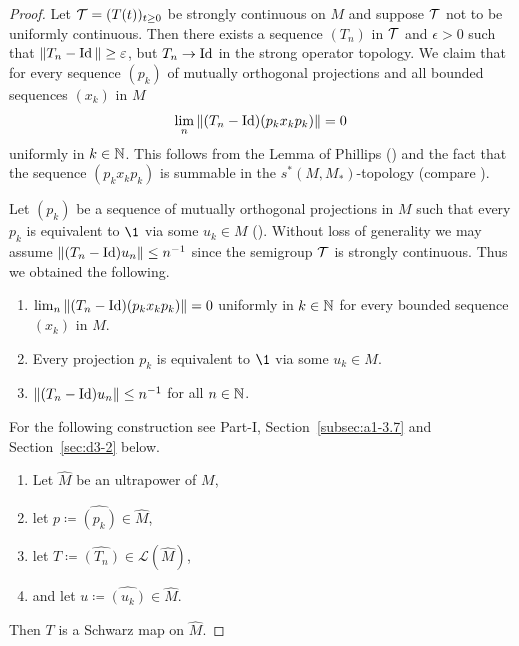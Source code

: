 \begin{proof}
Let $\TT = (T(t))_{t \geq 0}$ be strongly continuous on $M$ and suppose $\mathcal{T}$ not to be uniformly continuous.
Then there exists a sequence $(T_n)$  in  $ \mathcal{T} $ and $\epsilon > 0$ such that $\|T_n - \Id\| \geq \epsilon$, 
but $T_n \to \operatorname{Id}$ in the strong operator topology.
We claim that for every sequence $(p_{k})$ of mutually orthogonal projections and all bounded sequences $(x_{k})$ 
in $M$
\[
\lim_n \|(T_n - \operatorname{Id})(p_{k} x_{k} p_{k})\| = 0
\]
uniformly in $k \in \mathbb{N}$.
This follows from the {Lemma of Phillips} (\textcite[Lemma II.10.3]{schaefer:1974}) and the fact that the sequence $(p_{k} x_{k} p_{k})$ is summable in the $s^{*}(M,M_*)$-topology (compare \textcite[Lemma 2]{elliot:1972}).

Let $(p_{k})$ be a sequence of mutually orthogonal projections in $M$ such that every $p_{k}$ is equivalent to $\1$ via some $u_{k} \in M$ (\textcite[2.2]{sakai:1971}).
Without loss of generality we may assume $\|(T_n - \Id)u_n\| \leq n^{-1}$ since the semigroup $\mathcal{T}$ is strongly continuous.
Thus we obtained the following.
\begin{enumerate}[\upshape (i)]
\item 
$\lim_n \|(T_n - \operatorname{Id})(p_{k} x_{k} p_{k})\| = 0$ uniformly in $k \in \mathbb{N}$ for every bounded sequence $(x_{k})$ in $M$.
\item 
Every projection $p_{k}$ is equivalent to $\1$ via some $u_{k} \in M$.
\item 
$\|(T_n - \Id)u_n\| \leq n^{-1}$ for all $n \in \mathbb{N}$.
\end{enumerate}
For the following construction see Part-I, Section~\ref{subsec:a1-3.7} and Section~\ref{sec:d3-2} below.
\begin{enumerate}[\upshape (i)']
\item
Let $\widehat{M}$ be an ultrapower of\/ $M$,

\item
let $p \coloneq \widehat{(p_{k})} \in \widehat{M}$,

\item
let $T \coloneq \widehat{(T_{n}) }\in \mathcal{L}(\widehat{M})$,

\item
and let $u \coloneq \widehat{(u_{k})}  \in \widehat{M}$.

\end{enumerate}
Then $T$ is a Schwarz map on $\widehat{M}$.


\end{proof}
